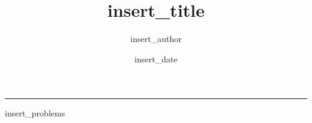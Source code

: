 \documentclass{amsart}
\begin{document}
\title{insert_title}
\author{insert_author}
\date{insert_date}
\maketitle

\thispagestyle{fancy}

\hrule
\vspace{3mm}

insert_problems
\end{document}
